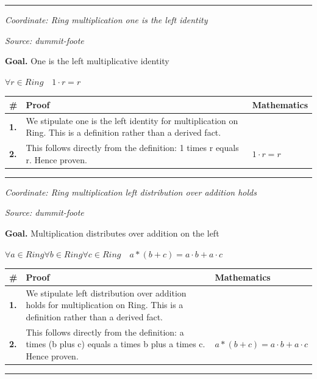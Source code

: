 \documentclass[11pt]{article}
\theoremstyle{definition}
\begin{document}
\label{thm:Ring-addition-zero_is_the_left_identity}
\par\medskip\hrule
\bigskip
{}\par
\smallskip\noindent\textit{Coordinate: Ring \cdot multiplication \cdot one is the left identity}\par
\smallskip\noindent\textit{Source: dummit-foote}\par
\medskip
\noindent\textbf{Goal.} One is the left multiplicative identity\par
\noindent$\displaystyle \forall r \in Ring\quad 1 \cdot r = r$\par
\medskip
\noindent
\begin{tabular}{@{} >{\raggedright\arraybackslash}p{} >{\raggedright\arraybackslash}p{} >{\raggedleft\arraybackslash}p{} @{}}
\textbf{\#} & \textbf{Proof} & \textbf{Mathematics} \\
\midrule
\textbf{1.} & We stipulate one is the left identity for multiplication on Ring. This is a definition rather than a derived fact. & \\[0.45em]
\textbf{2.} & This follows directly from the definition: 1 times r equals r. Hence proven. & $\displaystyle 1 \cdot r = r$ \\[0.45em]
\bottomrule
\end{tabular}
\label{thm:Ring-multiplication-one_is_the_left_identity}
\par\medskip\hrule
\bigskip
{}\par
\smallskip\noindent\textit{Coordinate: Ring \cdot multiplication \cdot left distribution over addition holds}\par
\smallskip\noindent\textit{Source: dummit-foote}\par
\medskip
\noindent\textbf{Goal.} Multiplication distributes over addition on the left\par
\noindent$\displaystyle \forall a \in Ring \forall b \in Ring \forall c \in Ring\quad a * (b + c) = a \cdot b + a \cdot c$\par
\medskip
\noindent
\begin{tabular}{@{} >{\raggedright\arraybackslash}p{} >{\raggedright\arraybackslash}p{} >{\raggedleft\arraybackslash}p{} @{}}
\textbf{\#} & \textbf{Proof} & \textbf{Mathematics} \\
\midrule
\textbf{1.} & We stipulate left distribution over addition holds for multiplication on Ring. This is a definition rather than a derived fact. & \\[0.45em]
\textbf{2.} & This follows directly from the definition: a times (b plus c) equals a times b plus a times c. Hence proven. & $\displaystyle a * (b + c) = a \cdot b + a \cdot c$ \\[0.45em]
\bottomrule
\end{tabular}
\label{thm:Ring-multiplication-left_distribution_over_addition_holds}
\par\medskip\hrule
\end{document}
